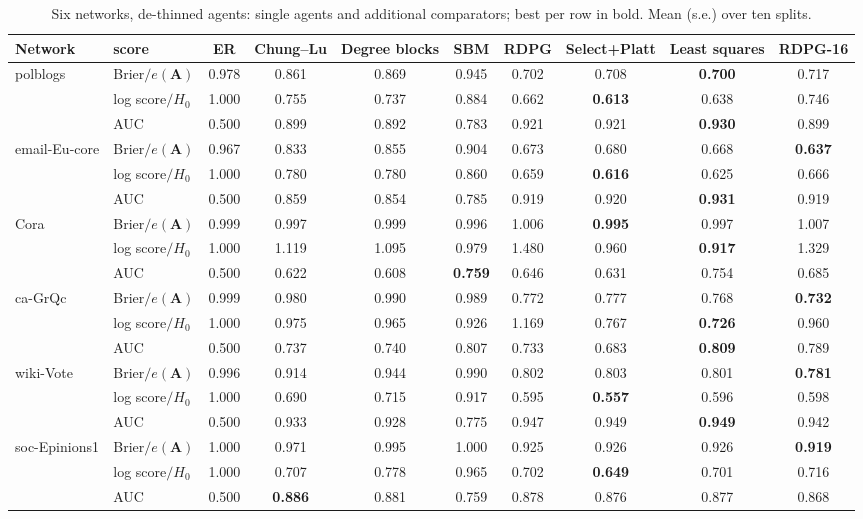 \documentclass[12pt]{article}
\begin{document}
\begin{table}[ht]
\centering
\caption{Six networks, de-thinned agents: single agents and additional comparators; best per row in bold. Mean (s.e.) over ten splits.}
\label{tab:agents}
\begin{tabular}{llcccccccc}
\toprule
Network & score & ER & Chung--Lu & Degree blocks & SBM & RDPG & Select+Platt & Least squares & RDPG-16 \\
\midrule
polblogs & Brier$/e(\mathbf{A})$ & 0.978 & 0.861 & 0.869 & 0.945 & 0.702 & 0.708 & \textbf{0.700} & 0.717 \\
 & log score$/H_0$ & 1.000 & 0.755 & 0.737 & 0.884 & 0.662 & \textbf{0.613} & 0.638 & 0.746 \\
 & AUC & 0.500 & 0.899 & 0.892 & 0.783 & 0.921 & 0.921 & \textbf{0.930} & 0.899 \\
email-Eu-core & Brier$/e(\mathbf{A})$ & 0.967 & 0.833 & 0.855 & 0.904 & 0.673 & 0.680 & 0.668 & \textbf{0.637} \\
 & log score$/H_0$ & 1.000 & 0.780 & 0.780 & 0.860 & 0.659 & \textbf{0.616} & 0.625 & 0.666 \\
 & AUC & 0.500 & 0.859 & 0.854 & 0.785 & 0.919 & 0.920 & \textbf{0.931} & 0.919 \\
Cora & Brier$/e(\mathbf{A})$ & 0.999 & 0.997 & 0.999 & 0.996 & 1.006 & \textbf{0.995} & 0.997 & 1.007 \\
 & log score$/H_0$ & 1.000 & 1.119 & 1.095 & 0.979 & 1.480 & 0.960 & \textbf{0.917} & 1.329 \\
 & AUC & 0.500 & 0.622 & 0.608 & \textbf{0.759} & 0.646 & 0.631 & 0.754 & 0.685 \\
ca-GrQc & Brier$/e(\mathbf{A})$ & 0.999 & 0.980 & 0.990 & 0.989 & 0.772 & 0.777 & 0.768 & \textbf{0.732} \\
 & log score$/H_0$ & 1.000 & 0.975 & 0.965 & 0.926 & 1.169 & 0.767 & \textbf{0.726} & 0.960 \\
 & AUC & 0.500 & 0.737 & 0.740 & 0.807 & 0.733 & 0.683 & \textbf{0.809} & 0.789 \\
wiki-Vote & Brier$/e(\mathbf{A})$ & 0.996 & 0.914 & 0.944 & 0.990 & 0.802 & 0.803 & 0.801 & \textbf{0.781} \\
 & log score$/H_0$ & 1.000 & 0.690 & 0.715 & 0.917 & 0.595 & \textbf{0.557} & 0.596 & 0.598 \\
 & AUC & 0.500 & 0.933 & 0.928 & 0.775 & 0.947 & 0.949 & \textbf{0.949} & 0.942 \\
soc-Epinions1 & Brier$/e(\mathbf{A})$ & 1.000 & 0.971 & 0.995 & 1.000 & 0.925 & 0.926 & 0.926 & \textbf{0.919} \\
 & log score$/H_0$ & 1.000 & 0.707 & 0.778 & 0.965 & 0.702 & \textbf{0.649} & 0.701 & 0.716 \\
 & AUC & 0.500 & \textbf{0.886} & 0.881 & 0.759 & 0.878 & 0.876 & 0.877 & 0.868 \\
\bottomrule
\end{tabular}

\end{table}
\end{document}
